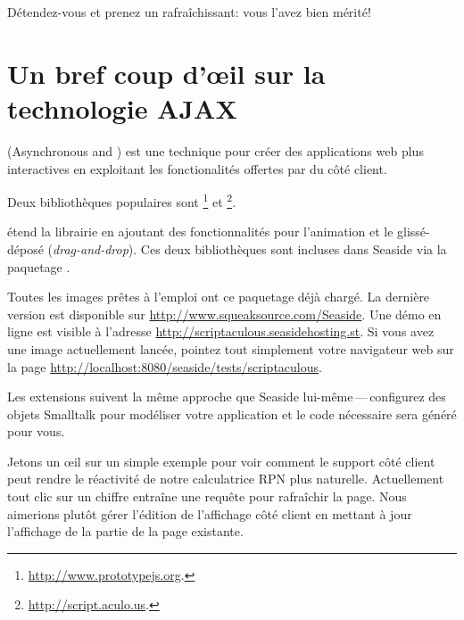 \documentclass[a4paper,10pt,twoside]{book}
\begin{document}

Détendez-vous et prenez un rafraîchissant: vous l'avez bien mérité!


\section{Un bref coup d'\oe il sur la technologie AJAX}


 (Asynchronous  and ) est une
technique pour créer des applications web plus interactives en
exploitant les fonctionalités offertes par \jscript du côté client.

Deux bibliothèques \jscript{} populaires sont \ind{\pjs}\footnote{\url{http://www.prototypejs.org}.} et \ind{\sau}\footnote{\url{http://script.aculo.us}.}.


\sau{} étend la librairie \pjs{} en ajoutant des fonctionnalités pour
l'animation et le glissé-déposé (\emph{drag-and-drop}).
Ces deux bibliothèques sont incluses dans Seaside via la paquetage
.

Toutes les images prêtes à l'emploi ont ce paquetage déjà chargé. La
dernière version est disponible sur
\url{http://www.squeaksource.com/Seaside}.
Une démo en ligne est visible à l'adresse 
\url{http://scriptaculous.seasidehosting.st}.
Si vous avez une image actuellement lancée, pointez tout simplement
votre navigateur web sur la page
\url{http://localhost:8080/seaside/tests/scriptaculous}.

Les extensions \sau{} suivent la même approche que Seaside
lui-même\,---\,configurez des objets Smalltalk pour modéliser votre
application et le code \jscript{} nécessaire sera généré pour vous.

Jetons un \oe il sur un simple exemple pour voir comment le support
\jscript{} côté client peut rendre le réactivité de notre calculatrice
RPN plus naturelle.
Actuellement tout clic sur un chiffre entraîne une requête pour
rafraîchir la page. Nous aimerions plutôt gérer l'édition de
l'affichage côté client en mettant à jour l'affichage 
de la partie  de la page existante.
\end{document}
